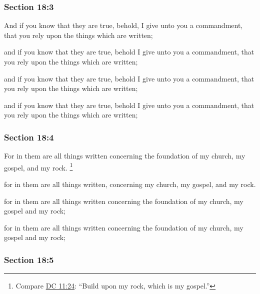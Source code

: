 	\subsubsection{Section 18:3} %
		\label{DC18-3}

		And if you know that they are true, behold, I give unto you a commandment, that you rely upon the things which are written;

		\begin{framed}
		\scriptsize
			\begin{compactdesc}
				\item[JSP] and if you know that they are true, behold I give unto you a commandment, that you rely upon the things which are written; 
				\item[DC 1835] and if you know that they are true, behold I give unto you a commandment, that you rely upon the things which are written; 
				\item[DC 1844] and if you know that they are true, behold I give unto you a commandment, that you rely upon the things which are written; 
			\end{compactdesc}
		\end{framed}

	\subsubsection{Section 18:4} %
		\label{DC18-4}

		For in them are all things written concerning the foundation of my church, my gospel, and my rock.%
			\footnote{%
				Compare \hyperref[DC11-24]{DC 11:24}: ``Build upon my rock, which is my gospel.''
				}

		\begin{framed}
		\scriptsize
			\begin{compactdesc}
				\item[JSP] for in them are all things written, concerning my church, my gospel, and my rock.
				\item[DC 1835] for in them are all things written concerning the foundation of my church, my gospel and my rock; 
				\item[DC 1844] for in them are all things written concerning the foundation of my church, my gospel and my rock; 
			\end{compactdesc}
		\end{framed}

	\subsubsection{Section 18:5} %
		\label{DC18-5}

